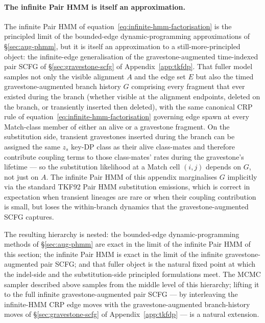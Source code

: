 \paragraph{The infinite Pair HMM is itself an approximation.} The
infinite Pair HMM of equation~\ref{eq:infinite-hmm-factorisation}
is the principled limit of the bounded-edge dynamic-programming
approximations of \S\ref{sec:aug-phmm}, but it is itself an
approximation to a still-more-principled object: the
infinite-edge generalisation of the gravestone-augmented
time-indexed pair SCFG of \S\ref{sec:gravestone-scfg} of
Appendix~\ref{app:tkfdp}. That fuller model samples not only the
visible alignment $A$ and the edge set $E$ but also the timed
gravestone-augmented branch history $G$ comprising every fragment
that ever existed during the branch (whether visible at the
alignment endpoints, deleted on the branch, or transiently
inserted then deleted), with the same canonical CRP rule of
equation~\ref{eq:infinite-hmm-factorisation} governing edge spawn
at every Match-class member of either an alive or a gravestone
fragment. On the substitution side, transient gravestones inserted
during the branch can be assigned the same $z_s$ key-DP class as
their alive class-mates and therefore contribute coupling terms to
those class-mates' rates during the gravestone's lifetime --- so
the substitution likelihood at a Match cell $(i, j)$ depends on
$G$, not just on $A$. The infinite Pair HMM of this appendix
marginalises $G$ implicitly via the standard TKF92 Pair HMM
substitution emissions, which is correct in expectation when
transient lineages are rare or when their coupling contribution is
small, but loses the within-branch dynamics that the
gravestone-augmented SCFG captures.

The resulting hierarchy is nested: the bounded-edge
dynamic-programming methods of \S\ref{sec:aug-phmm} are exact in
the limit of the infinite Pair HMM of this section; the infinite
Pair HMM is exact in the limit of the infinite gravestone-augmented
pair SCFG; and that fuller object is the natural fixed point at
which the indel-side and the substitution-side principled
formulations meet. The MCMC sampler described above samples from
the middle level of this hierarchy; lifting it to the full
infinite gravestone-augmented pair SCFG --- by interleaving the
infinite-HMM CRP edge moves with the gravestone-augmented
branch-history moves of \S\ref{sec:gravestone-scfg} of
Appendix~\ref{app:tkfdp} --- is a natural extension.

